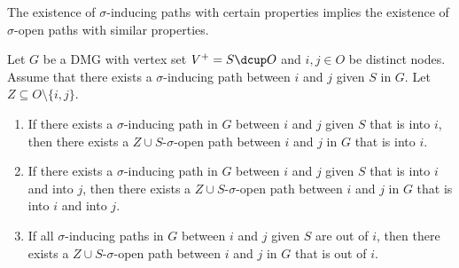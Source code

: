 The existence of $\sigma$-inducing paths with certain properties implies the existence of $\sigma$-open paths with similar properties.
\begin{Prp}\label{prp:sigma-inducing_path_orientations}
  Let $G$ be a DMG with vertex set $V^+ = S \dcup O$ and $i,j \in O$ be distinct nodes.
  Assume that there exists a $\sigma$-inducing path between $i$ and $j$ given $S$ in $G$.
  Let $Z \subseteq O \setminus \{i,j\}$.
  \begin{enumerate}[label=(\arabic*)]
    \item If there exists a $\sigma$-inducing path in $G$ between $i$ and $j$ given $S$ that is into $i$, then there exists a $Z \cup S$-$\sigma$-open path between $i$ and $j$ in $G$ that is into $i$. 
    \item If there exists a $\sigma$-inducing path in $G$ between $i$ and $j$ given $S$ that is into $i$ and into $j$, then there exists a $Z \cup S$-$\sigma$-open path between $i$ and $j$ in $G$ that is into $i$ and into $j$. 
    \item If all $\sigma$-inducing paths in $G$ between $i$ and $j$ given $S$ are out of $i$, then there exists a $Z \cup S$-$\sigma$-open path between $i$ and $j$ in $G$ that is out of $i$. 
  \end{enumerate}
\end{Prp}
